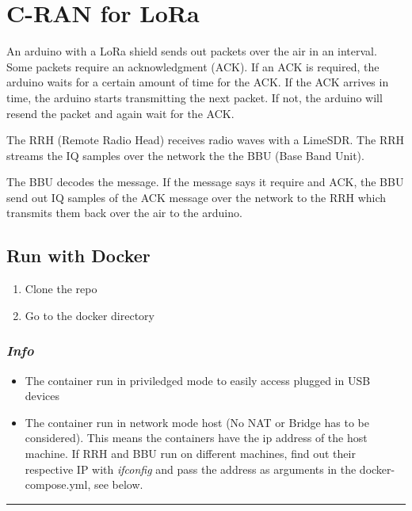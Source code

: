 \section{C-RAN for LoRa}\label{c-ran-for-lora}

An arduino with a LoRa shield sends out packets over the air in an
interval. Some packets require an acknowledgment (ACK). If an ACK is
required, the arduino waits for a certain amount of time for the ACK. If
the ACK arrives in time, the arduino starts transmitting the next
packet. If not, the arduino will resend the packet and again wait for
the ACK.

The RRH (Remote Radio Head) receives radio waves with a LimeSDR. The RRH
streams the IQ samples over the network the the BBU (Base Band Unit).

The BBU decodes the message. If the message says it require and ACK, the
BBU send out IQ samples of the ACK message over the network to the RRH
which transmits them back over the air to the arduino.

\subsection{Run with Docker}\label{run-with-docker}

\begin{enumerate}
\def\labelenumi{\arabic{enumi}.}
\tightlist
\item
  Clone the repo
\item
  Go to the docker directory
\end{enumerate}

\subsubsection{\texorpdfstring{\textbf{\emph{Info}}}{Info}}\label{info}

\begin{itemize}
\tightlist
\item
  The container run in priviledged mode to easily access plugged in USB
  devices
\item
  The container run in network mode host (No NAT or Bridge has to be
  considered). This means the containers have the ip address of the host
  machine. If RRH and BBU run on different machines, find out their
  respective IP with \emph{ifconfig} and pass the address as arguments
  in the docker-compose.yml, see below.
\end{itemize}

\begin{center}\rule{0.5\linewidth}{\linethickness}\end{center}

